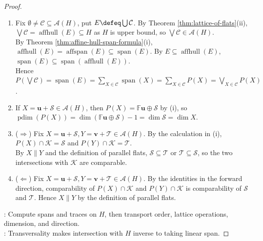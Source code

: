 \begin{theorem}
\begin{proof}
\begin{enumerate}[label=(\roman*)]
Hence $\bigcap\mathcal{C}=\mathbf{z}+\bigcap\limits_{X\in\mathcal{C}}\mathcal{S}_X$ by Lemma \ref{lem:intersection-of-flats}. Since $\mathbf{z}\notin\mathcal{K}$, $(\forall\,X\in\mathcal{C})\,\mathcal{S}_X\leq\mathcal{K}$, $\bigcap\limits_{X\in\mathcal{C}}P(X)=\bigcap\limits_{X\in\mathcal{C}}(\mathbb{F}\mathbf{z}\oplus\mathcal{S}_X)=\mathbb{F}\mathbf{z}\oplus\bigcap\limits_{X\in\mathcal{C}}\mathcal{S}_X=P(\bigcap\mathcal{C})$.
\item[$(v)$] Fix $\emptyset\neq\mathcal{C}\subseteq\mathcal{A}(H)$, put $E\defeq\bigcup\mathcal{C}$. By Theorem \ref{thm:lattice-of-flats}(ii), $\bigvee\mathcal{C}=\operatorname{affhull}(E)\subseteq H$ as $H$ is upper bound, so $\bigvee\mathcal{C}\in\mathcal{A}(H)$.\\
By Theorem \ref{thm:affine-hull-span-formula}(i), $\operatorname{affhull}(E)=\operatorname{affspan}(E)\subseteq\operatorname{span}(E)$. By $E\subseteq\operatorname{affhull}(E)$, $\operatorname{span}(E)\subseteq\operatorname{span}(\operatorname{affhull}(E))$.\\
Hence $P(\bigvee\mathcal{C})=\operatorname{span}(E)=\sum\limits_{X\in\mathcal{C}}\operatorname{span}(X)=\sum\limits_{X\in\mathcal{C}}P(X)=\bigvee\limits_{X\in\mathcal{C}}P(X)$.
\item[$(vi)$] If $X=\mathbf{u}+\mathcal{S}\in\mathcal{A}(H)$, then $P(X)=\mathbb{F}\mathbf{u}\oplus\mathcal{S}$ by (i), so $\operatorname{pdim}(P(X))=\dim(\mathbb{F}\mathbf{u}\oplus\mathcal{S})-1=\dim\mathcal{S}=\dim X$.
\item[$(vii)$] ($\Rightarrow$) Fix $X=\mathbf{u}+\mathcal{S},Y=\mathbf{v}+\mathcal{T}\in\mathcal{A}(H)$. By the calculation in (i), $P(X)\cap\mathcal{K}=\mathcal{S}$ and $P(Y)\cap\mathcal{K}=\mathcal{T}$.\\
By $X\parallel Y$ and the definition of parallel flats, $\mathcal{S}\subseteq\mathcal{T}$ or $\mathcal{T}\subseteq\mathcal{S}$, so the two intersections with $\mathcal{K}$ are comparable.
\item[$(vii)$] ($\Leftarrow$) Fix $X=\mathbf{u}+\mathcal{S},Y=\mathbf{v}+\mathcal{T}\in\mathcal{A}(H)$. By the identities in the forward direction, comparability of $P(X)\cap\mathcal{K}$ and $P(Y)\cap\mathcal{K}$ is comparability of $\mathcal{S}$ and $\mathcal{T}$. Hence $X\parallel Y$ by the definition of parallel flats.
\end{enumerate}
: Compute spans and traces on $H$, then transport order, lattice operations, dimension, and direction.\\
: Transversality makes intersection with $H$ inverse to taking linear span.
\end{proof}
\end{theorem}

